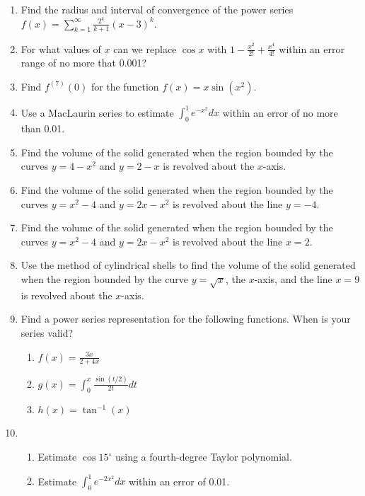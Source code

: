 \documentclass[12pt]{article}
\begin{document}
\begin{enumerate}
\item Find the radius and interval of convergence of the power 
series $f(x) = \sum_{k=1}^{\infty} {\frac{2^k}{k+1}} (x-3)^k$.
\medskip

\item For what values of $x$ can we replace $\cos x$ with $1 - 
{\frac{x^2}{2!}} + {\frac{x^4}{4!}}$ within an error range of no more 
that 0.001?
\medskip

\item  Find $f^{(7)}(0)$ for the function $f(x)=x \sin (x^2)$.
\medskip

\item Use a MacLaurin series to estimate $\int_0^1 e^{-x^2} dx$ 
within an error of no more than 0.01.
\medskip

\item  Find the volume of the solid generated when the region 
bounded by the curves $y=4-x^2$ and $y=2-x$ is 
revolved about the $x$-axis.
\medskip


\item Find the volume of the solid generated when the region 
bounded by the curves $y=x^2-4$ and $y=2x-x^2$ is 
revolved about the line $y=-4$.
\medskip

\item Find the volume of the solid generated when the region 
bounded by the curves $y=x^2-4$ and $y=2x-x^2$ is 
revolved about the line $x=2$.
\medskip

\item Use the method of cylindrical shells to find the volume of the 
solid generated when the region bounded 
by the curve $y=\sqrt{x}$, the $x$-axis, and the line $x=9$ is revolved 
about the $x$-axis. 
\medskip

\item Find a power series representation for the following
functions. When is your series valid?

\begin{enumerate}
\item  $f(x)={\frac{3x}{2+4x}}$ \smallskip
\item $g(x)=\int_0^x {\frac{\sin(t/2)}{2t}} dt$ \smallskip
\item  $h(x)=\tan^{-1}(x)$
\medskip 
\end{enumerate}

\item 

\begin{enumerate}
\item  Estimate $\cos 15^{\circ}$ using a fourth-degree Taylor
polynomial.
\medskip
\item Estimate $\int_0^1 e^{-2x^2} dx$ within an error of 0.01.
\medskip 
\end{enumerate}

\end{enumerate}
\end{document}
